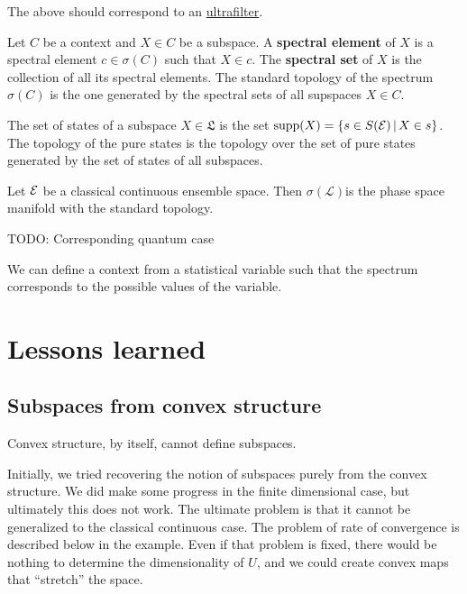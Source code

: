 \begin{remark}
	The above should correspond to an \href{https://en.wikipedia.org/wiki/Ultrafilter}{ultrafilter}.
\end{remark}

\begin{defn}
	Let $C$ be a context and $X \in C$ be a subspace. A \textbf{spectral element} of $X$ is a spectral element $c \in \sigma(C)$ such that $X \in c$. The \textbf{spectral set} of $X$ is the collection of all its spectral elements. The standard topology of the spectrum $\sigma(C)$ is the one generated by the spectral sets of all supspaces $X \in C$.
\end{defn}

\begin{defn}
	The set of states of a subspace $X \in \mathfrak{L}$ is the set $\mathrm{supp}(X) = \{ s \in S(\mathcal{E}) \, | \, X \in s \}$. The topology of the pure states is the topology over the set of pure states generated by the set of states of all subspaces.
\end{defn}

\begin{conj}
	Let $\mathcal{E}$ be a classical continuous ensemble space. Then $\sigma(\mathcal{L})$is the phase space manifold with the standard topology.
\end{conj}

\begin{conj}
	TODO: Corresponding quantum case
\end{conj}

\begin{conj}
	We can define a context from a statistical variable such that the spectrum corresponds to the possible values of the variable.
\end{conj}



\section{Lessons learned}

\subsection{Subspaces from convex structure}

\begin{insight}
	Convex structure, by itself, cannot define subspaces.
\end{insight}

Initially, we tried recovering the notion of subspaces purely from the convex structure. We did make some progress in the finite dimensional case, but ultimately this does not work. The ultimate problem is that it cannot be generalized to the classical continuous case. The problem of rate of convergence is described below in the example. Even if that problem is fixed, there would be nothing to determine the dimensionality of $U$, and we could create convex maps that ``stretch'' the space.

